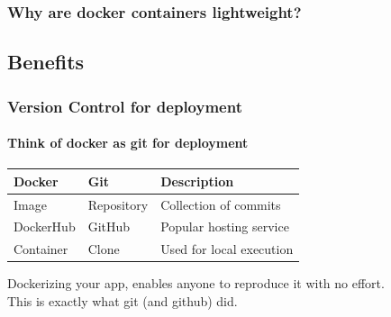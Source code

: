 \documentclass[mathserif,serif]{beamer}
\begin{document}
    \begin{frame}
        \frametitle{Why are docker containers lightweight?}
        \begin{center}
        \end{center}
    \end{frame}


    \subsection{Benefits}\label{subsec:separationOfConcerns}
    \begin{frame}
        \frametitle{Version Control for deployment}
        \framesubtitle{Think of docker as git for deployment}
        \begin{center}
            \begin{tabular}{ | l | l | l | }
                \hline
                \textbf{Docker} & \textbf{Git} & \textbf{Description} \\
                \hline
                Image & Repository & Collection of commits \\
                DockerHub & GitHub & Popular hosting service \\
                Container & Clone & Used for local execution \\
                \hline
            \end{tabular}
        \end{center}
        Dockerizing your app, enables anyone to reproduce it with no effort. \\
        This is exactly what git (and github) did.
    \end{frame}
\end{document}
